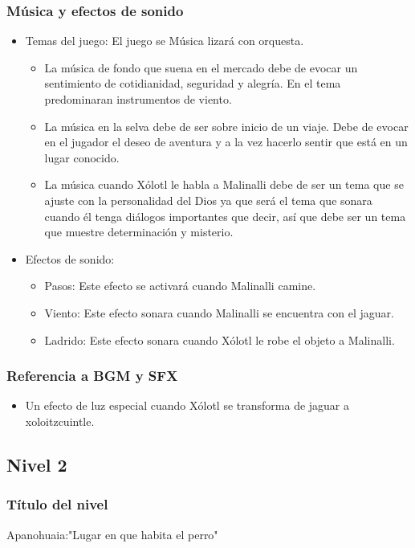 \documentclass[11pt,letterpaper]{article}
\begin{document}
\subsubsection{Música y efectos de sonido}
\begin{itemize} 
\item Temas del juego: El juego se Música lizará con orquesta.
\begin{itemize}
		\item La música de fondo que suena en el mercado debe de evocar un sentimiento de cotidianidad, seguridad y alegría. En el tema predominaran instrumentos de viento.
		\item La música en la selva debe de ser sobre inicio de un viaje. Debe de evocar en el jugador el deseo de aventura y a la vez hacerlo sentir que está en un lugar conocido.
		\item La música cuando Xólotl le habla a Malinalli debe de ser un tema que se ajuste con la personalidad del Dios ya que será el tema que sonara cuando él tenga diálogos importantes que decir, así que debe ser un tema que muestre determinación y misterio.
\end{itemize} 
\item Efectos de sonido:
	\begin{itemize}
		\item Pasos: Este efecto se activará cuando Malinalli camine.
		\item Viento: Este efecto sonara cuando Malinalli se encuentra con el jaguar.
		\item Ladrido: Este efecto sonara cuando Xólotl le robe el objeto a Malinalli.
\end{itemize}
\end{itemize}
\subsubsection{Referencia a BGM y SFX}
\begin{itemize}
	\item Un efecto de luz especial cuando Xólotl se transforma de jaguar a xoloitzcuintle.

\end{itemize}



	
		\subsection{Nivel 2}
	\subsubsection{Título del nivel}
	Apanohuaia:"Lugar en que habita el perro"
\end{document}
